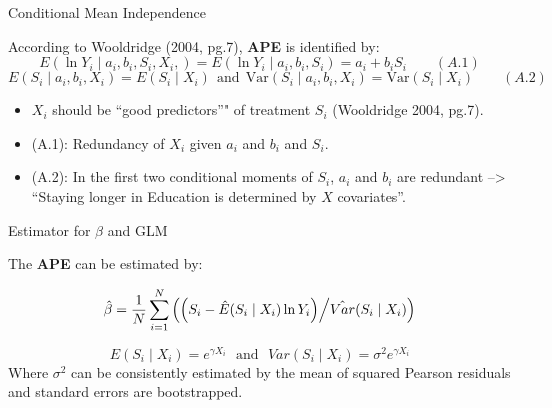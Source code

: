 \documentclass[10pt,ignorenonframetext,]{beamer}
\providecommand{\tightlist}{%
  \setlength{\itemsep}{0pt}\setlength{\parskip}{0pt}}
\begin{document}
\begin{frame}{Conditional Mean Independence}
\protect\hypertarget{conditional-mean-independence}{}

According to Wooldridge (2004, pg.7), \textbf{APE} is identified by:
\[E (\ln Y_i \mid a_i, b_i, S_i, X_i,) = E (\ln Y_i \mid a_i, b_i, S_i) = a_i+b_i S_i \qquad (A.1)\]
\[E(S_i \mid a_i, b_i, X_i) = E(S_i \mid X_i) ~~\text{and}~~ \mathrm{Var}(S_i \mid 
a_i, b_i, X_i) = \mathrm{Var} (S_i \mid X_i) \qquad (A.2)\]

\begin{itemize}
\tightlist
\item
  \(X_i\) should be ``good predictors''" of treatment \(S_i\)
  (Wooldridge 2004, pg.7).
\item
  (A.1): Redundancy of \(X_i\) given \(a_i\) and \(b_i\) and \(S_i\).
\item
  (A.2): In the first two conditional moments of \(S_i\), \(a_i\) and
  \(b_i\) are redundant --\textgreater{} ``Staying longer in Education
  is determined by \(X\) covariates''.
\end{itemize}

\end{frame}

\begin{frame}{Estimator for \(\beta\) and GLM}
\protect\hypertarget{estimator-for-beta-and-glm}{}

The \textbf{APE} can be estimated by:

\[\hat \beta = \frac{1}{N} \sum_{i=1}^N \left( \left( S_i - \hat E (S_i \mid X_i) \ln Y_i \right) \middle/
\hat{Var}(S_i \mid X_i)\right)\]

\[E(S_i \mid X_i ) = e^{\gamma X_i}  ~~~\text{and}~~~ Var(S_i \mid X_i ) = \sigma^2e^{\gamma X_i}\]
Where \(\sigma^2\) can be consistently estimated by the mean of squared
Pearson residuals and standard errors are bootstrapped.

\end{frame}
\end{document}
